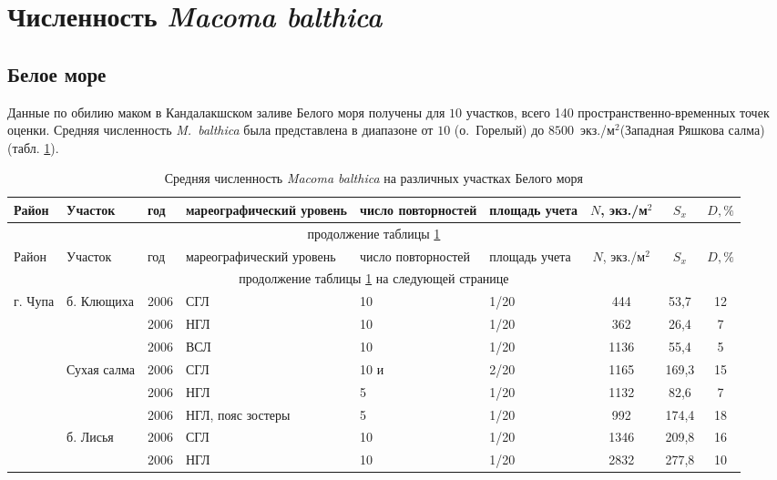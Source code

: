\documentclass[12pt, a4paper]{disser}
\begin{document}
	\section{Численность {\it Macoma balthica}}
	\subsection{Белое море}
Данные по обилию маком в Кандалакшском заливе Белого моря получены для $10$ участков, всего 140 пространственно-временных точек оценки.
Средняя численность {\it M.~balthica} была представлена в диапазоне от $10$ (о.~Горелый) до $8500$~экз./м$^2$(Западная Ряшкова салма) (табл. \ref{tab:mean_N_White}).
	\begin{footnotesize}
	\begin{longtable}{|p{2cm}|p{3cm}|p{1cm}|p{2cm}|p{1.5cm}|p{1cm}|*{3}{c|}}
	\caption{Средняя численность {\it Macoma balthica} на различных участках Белого моря}\label{tab:mean_N_White}\\
	\hline
	Район & Участок & год & ма\-ре\-ографи\-ческий уровень & число повторностей & площадь учета & $N$, экз./м$^2$ & $S_x$  & $D, \%$ 
	\\ \hline \endfirsthead
	\hline
	\multicolumn{9}{|c|}{продолжение таблицы \ref{tab:mean_N_White}} \\ \hline
	Район & Участок & год & ма\-ре\-ографи\-ческий уровень & число повторностей & площадь учета & $N$, экз./м$^2$ & $S_x$  & $D, \%$ 
	\\ \hline \endhead
	\hline 
	\multicolumn{9}{|c|}{продолжение таблицы \ref{tab:mean_N_White} на следующей странице}
	\\ \hline \endfoot
	 \endlastfoot
	г. Чупа & б. Клющиха & 2006 & СГЛ & 10 & 1/20 & 444 & 53,7 & 12
		\\ \cline{3-9}
		 &  & 2006 & НГЛ & 10 & 1/20 & 362 & 26,4 & 7
		\\ \cline{3-9}
		 &  & 2006 & ВСЛ & 10 & 1/20 & 1136 & 55,4 & 5
		\\ \cline{2-9}
		 & Сухая салма & 2006 & СГЛ & 10 и & 2/20 & 1165 & 169,3 & 15
		\\ \cline{3-9}
		 &  & 2006 & НГЛ & 5 & 1/20 & 1132 & 82,6 & 7
		\\ \cline{3-9}
		 &  & 2006 & НГЛ, пояс зостеры & 5 & 1/20 & 992 & 174,4 & 18
		\\ \cline{2-9}
		 & б. Лисья & 2006 & СГЛ & 10 & 1/20 & 1346 & 209,8 & 16
		\\ \cline{3-9}
		 &  & 2006 & НГЛ & 10 & 1/20 & 2832 & 277,8 & 10
		\\ \cline{3-9}

\end{longtable}
\end{footnotesize}
\end{document}
